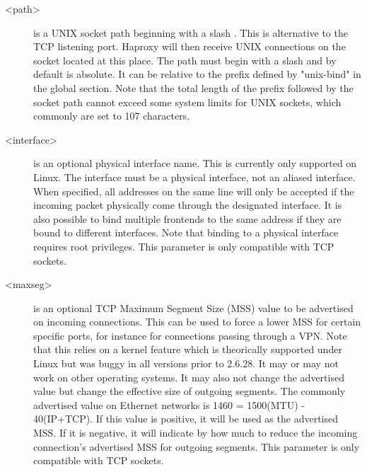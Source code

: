 \begin{description}
  \item[<path>]        is a UNIX socket path beginning with a slash \chr{/}. This is
                  alternative to the TCP listening port. Haproxy will then
                  receive UNIX connections on the socket located at this place.
                  The path must begin with a slash and by default is absolute.
                  It can be relative to the prefix defined by "unix-bind" in
                  the global section. Note that the total length of the prefix
                  followed by the socket path cannot exceed some system limits
                  for UNIX sockets, which commonly are set to 107 characters.

  \item[<interface>]   is an optional physical interface name. This is currently
                  only supported on Linux. The interface must be a physical
                  interface, not an aliased interface. When specified, all
                  addresses on the same line will only be accepted if the
                  incoming packet physically come through the designated
                  interface. It is also possible to bind multiple frontends to
                  the same address if they are bound to different interfaces.
                  Note that binding to a physical interface requires root
                  privileges. This parameter is only compatible with TCP
                  sockets.

  \item[<maxseg>]      is an optional TCP Maximum Segment Size (MSS) value to be
                  advertised on incoming connections. This can be used to force
                  a lower MSS for certain specific ports, for instance for
                  connections passing through a VPN. Note that this relies on a
                  kernel feature which is theorically supported under Linux but
                  was buggy in all versions prior to 2.6.28. It may or may not
                  work on other operating systems. It may also not change the
                  advertised value but change the effective size of outgoing
                  segments. The commonly advertised value on Ethernet networks
                  is 1460 = 1500(MTU) - 40(IP+TCP). If this value is positive,
                  it will be used as the advertised MSS. If it is negative, it
                  will indicate by how much to reduce the incoming connection's
                  advertised MSS for outgoing segments. This parameter is only
                  compatible with TCP sockets.


\end{description}
